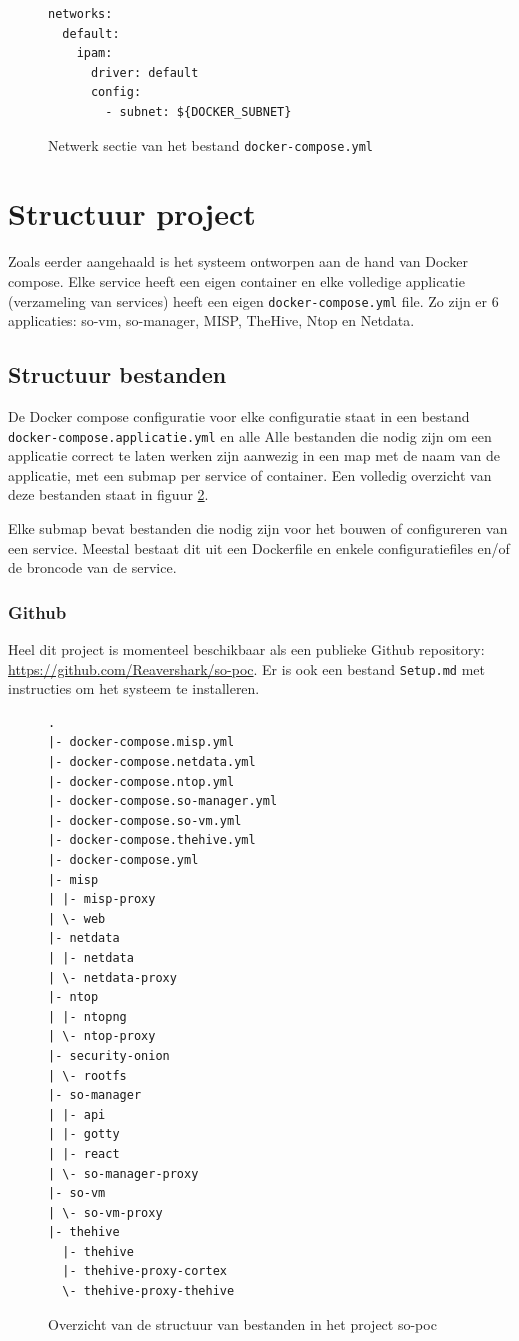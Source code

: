 \documentclass[a4paper,12pt]{report}
\begin{document}
\begin{figure}[H]
  \begin{lstlisting}
networks:
  default:
    ipam:
      driver: default
      config:
        - subnet: ${DOCKER_SUBNET}
  \end{lstlisting}
  \caption{Netwerk sectie van het bestand \lstinline|docker-compose.yml|}
  \label{fig:docker-compose-network}
\end{figure}

\section{Structuur project}
Zoals eerder aangehaald is het systeem ontworpen aan de hand van Docker compose.
Elke service heeft een eigen container en elke volledige applicatie (verzameling van services) heeft een eigen \lstinline|docker-compose.yml| file.
Zo zijn er 6 applicaties: so-vm, so-manager, MISP, TheHive, Ntop en Netdata.

\subsection{Structuur bestanden}
De Docker compose configuratie voor elke configuratie staat in een bestand \lstinline|docker-compose.applicatie.yml| en alle 
Alle bestanden die nodig zijn om een applicatie correct te laten werken zijn aanwezig in een map met de naam van de applicatie, met een submap per service of container.
Een volledig overzicht van deze bestanden staat in figuur \ref{fig:so-poc-structuur-docker-compose-containers}.

Elke submap bevat bestanden die nodig zijn voor het bouwen of configureren van een service.
Meestal bestaat dit uit een Dockerfile en enkele configuratiefiles en/of de broncode van de service.

\subsubsection{Github}
Heel dit project is momenteel beschikbaar als een publieke Github repository: \url{https://github.com/Reavershark/so-poc}.
Er is ook een bestand \lstinline|Setup.md| met instructies om het systeem te installeren.

\begin{figure}[H]
  \begin{lstlisting}
.
|- docker-compose.misp.yml
|- docker-compose.netdata.yml
|- docker-compose.ntop.yml
|- docker-compose.so-manager.yml
|- docker-compose.so-vm.yml
|- docker-compose.thehive.yml
|- docker-compose.yml
|- misp
| |- misp-proxy
| \- web
|- netdata
| |- netdata
| \- netdata-proxy
|- ntop
| |- ntopng
| \- ntop-proxy
|- security-onion
| \- rootfs
|- so-manager
| |- api
| |- gotty
| |- react
| \- so-manager-proxy
|- so-vm
| \- so-vm-proxy
|- thehive
  |- thehive
  |- thehive-proxy-cortex
  \- thehive-proxy-thehive
  \end{lstlisting}
  \caption{Overzicht van de structuur van bestanden in het project so-poc}
  \label{fig:so-poc-structuur-docker-compose-containers}
\end{figure}
\end{document}
